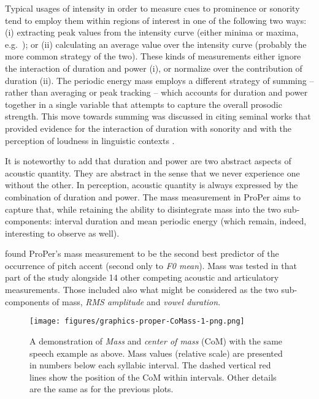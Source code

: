 Typical usages of intensity in order to measure cues to prominence or sonority tend to employ them within regions of interest in one of the following two ways: (i) extracting peak values from the intensity curve (either minima or maxima, e.g.~\citealt{parker2008sound}); or (ii) calculating an average value over the intensity curve (probably the more common strategy of the two). These kinds of measurements either ignore the interaction of duration and power (i), or normalize over the contribution of duration (ii). The periodic energy mass employs a different strategy of summing -- rather than averaging or peak tracking -- which accounts for duration and power together in a single variable that attempts to capture the overall prosodic strength. This move towards summing was discussed in  citing seminal works that provided evidence for the interaction of duration with sonority \citep{price1980sonority} and with the perception of loudness in linguistic contexts \citep{turk1996processing}.

It is noteworthy to add that duration and power are two abstract aspects of acoustic quantity. They are abstract in the sense that we never experience one without the other. In perception, acoustic quantity is always expressed by the combination of duration and power. The mass measurement in ProPer aims to capture that, while retaining the ability to  disintegrate mass into the two sub-components: interval duration and mean periodic energy (which remain, indeed, interesting to observe as well).

\citet{roessig2022tracing} found ProPer's mass measurement to be the second best predictor of the occurrence of pitch accent (second only to \textit{F0 mean}). Mass was tested in that part of the study alongside 14 other competing acoustic and articulatory measurements. Those included also what might be considered as the two sub-components of mass, \textit{RMS amplitude} and \textit{vowel duration}.

\begin{figure}
\texttt{[image: figures/graphics-proper-CoMass-1-png.png]} 
\caption{A demonstration of \emph{Mass} and \emph{center of mass} (CoM) with the same speech example as above. Mass values (relative scale) are presented in numbers below each syllabic interval. The dashed vertical red lines show the position of the CoM within intervals. Other details are the same as for the previous plots.}\label{fig:proper-CoMass}
\end{figure}

